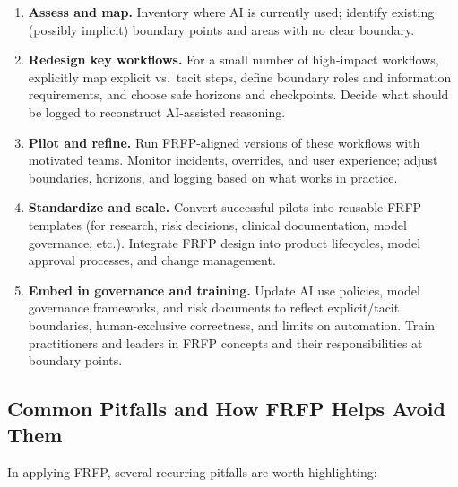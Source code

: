 \begin{enumerate}
  \item \textbf{Assess and map.}
  Inventory where AI is currently used; identify existing (possibly implicit) boundary points and areas with no clear boundary.

  \item \textbf{Redesign key workflows.}
  For a small number of high-impact workflows, explicitly map explicit vs.\ tacit steps, define boundary roles and information requirements, and choose safe horizons and checkpoints.
  Decide what should be logged to reconstruct AI-assisted reasoning.

  \item \textbf{Pilot and refine.}
  Run FRFP-aligned versions of these workflows with motivated teams.
  Monitor incidents, overrides, and user experience; adjust boundaries, horizons, and logging based on what works in practice.

  \item \textbf{Standardize and scale.}
  Convert successful pilots into reusable FRFP templates (for research, risk decisions, clinical documentation, model governance, etc.).
  Integrate FRFP design into product lifecycles, model approval processes, and change management.

  \item \textbf{Embed in governance and training.}
  Update AI use policies, model governance frameworks, and risk documents to reflect explicit/tacit boundaries, human-exclusive correctness, and limits on automation.
  Train practitioners and leaders in FRFP concepts and their responsibilities at boundary points.
\end{enumerate}

\subsection{Common Pitfalls and How FRFP Helps Avoid Them}

In applying FRFP, several recurring pitfalls are worth highlighting:

